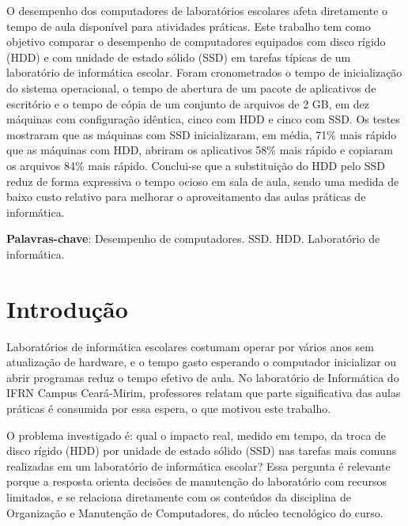 \documentclass[article,12pt,a4paper,oneside]{abntex2}
\begin{document}
\maketitle
\thispagestyle{fancy}

\begin{resumo}
O desempenho dos computadores de laboratórios escolares afeta diretamente o
tempo de aula disponível para atividades práticas. Este trabalho tem como
objetivo comparar o desempenho de computadores equipados com disco rígido
(HDD) e com unidade de estado sólido (SSD) em tarefas típicas de um
laboratório de informática escolar. Foram cronometrados o tempo de
inicialização do sistema operacional, o tempo de abertura de um pacote de
aplicativos de escritório e o tempo de cópia de um conjunto de arquivos de
2 GB, em dez máquinas com configuração idêntica, cinco com HDD e cinco com
SSD. Os testes mostraram que as máquinas com SSD inicializaram, em média,
71\% mais rápido que as máquinas com HDD, abriram os aplicativos 58\% mais
rápido e copiaram os arquivos 84\% mais rápido. Conclui-se que a substituição
do HDD pelo SSD reduz de forma expressiva o tempo ocioso em sala de aula,
sendo uma medida de baixo custo relativo para melhorar o aproveitamento das
aulas práticas de informática.

\vspace{\onelineskip}
\noindent
\textbf{Palavras-chave}: Desempenho de computadores. SSD. HDD. Laboratório de informática.
\end{resumo}

\textual
\pagestyle{fancy}

\section{Introdução}

Laboratórios de informática escolares costumam operar por vários anos sem
atualização de hardware, e o tempo gasto esperando o computador inicializar
ou abrir programas reduz o tempo efetivo de aula. No laboratório de
Informática do IFRN Campus Ceará-Mirim, professores relatam que parte
significativa das aulas práticas é consumida por essa espera, o que motivou
este trabalho.

O problema investigado é: qual o impacto real, medido em tempo, da troca de
disco rígido (HDD) por unidade de estado sólido (SSD) nas tarefas mais
comuns realizadas em um laboratório de informática escolar? Essa pergunta é
relevante porque a resposta orienta decisões de manutenção do laboratório
com recursos limitados, e se relaciona diretamente com os conteúdos da
disciplina de Organização e Manutenção de Computadores, do núcleo
tecnológico do curso.
\end{document}
